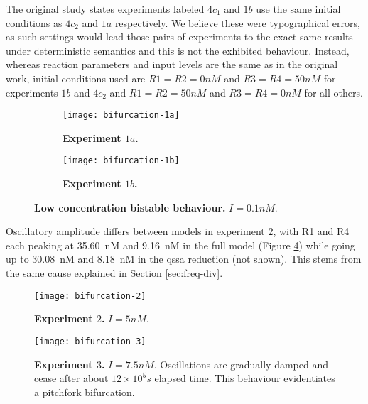     The original study states experiments labeled $4c_{1}$ and $1b$ use the same initial conditions as $4c_{2}$ and $1a$ respectively.
    We believe these were typographical errors, as such settings would lead those pairs of experiments to the exact same results under deterministic semantics and this is not the exhibited behaviour.
    Instead, whereas reaction parameters and input levels are the same as in the original work, initial conditions used are $R1=R2=0nM$ and $R3=R4=50nM$ for experiments $1b$ and $4c_{2}$ and $R1=R2=50nM$ and $R3=R4=0nM$ for all others.

    \begin{figure}[!htbp]
      \centering
      \begin{subfigure}[t]{0.87\textwidth}
        \centering
        \texttt{[image: bifurcation-1a]}
        \caption{\textbf{Experiment $1a$.}}
        \label{fig:bifurcation-1a}
      \end{subfigure}
      \begin{subfigure}[t]{0.87\textwidth}
        \centering
        \texttt{[image: bifurcation-1b]}
        \caption{\textbf{Experiment $1b$.}}
        \label{fig:bifurcation-1b}
      \end{subfigure}
      \caption{\textbf{Low concentration bistable behaviour.} $I = 0.1 nM$.}
      \label{fig:bifurcation-1}
    \end{figure}

    Oscillatory amplitude differs between models in experiment $2$, with R1 and R4 each peaking at \SI{35.60}{\nano M} and \SI{9.16}{\nano M} in the full model (Figure \ref{fig:bifurcation-2}) while going up to \SI{30.08}{\nano M} and \SI{8.18}{\nano M} in the \ac{qssa} reduction (not shown).
    This stems from the same cause explained in Section \ref{sec:freq-div}.

    \begin{figure}[!htbp]
      \centering
      \texttt{[image: bifurcation-2]}
      \caption{\textbf{Experiment $2$.} $I = 5 nM$.}
      \label{fig:bifurcation-2}
    \end{figure}

    \begin{figure}[!htbp]
      \centering
      \texttt{[image: bifurcation-3]}
      \caption{\textbf{Experiment $3$.} $I = 7.5nM$. Oscillations are gradually damped and cease after about $12 \times 10^5 s$ elapsed time. This behaviour evidentiates a pitchfork bifurcation.}
      \label{fig:bifurcation-3}
    \end{figure}

